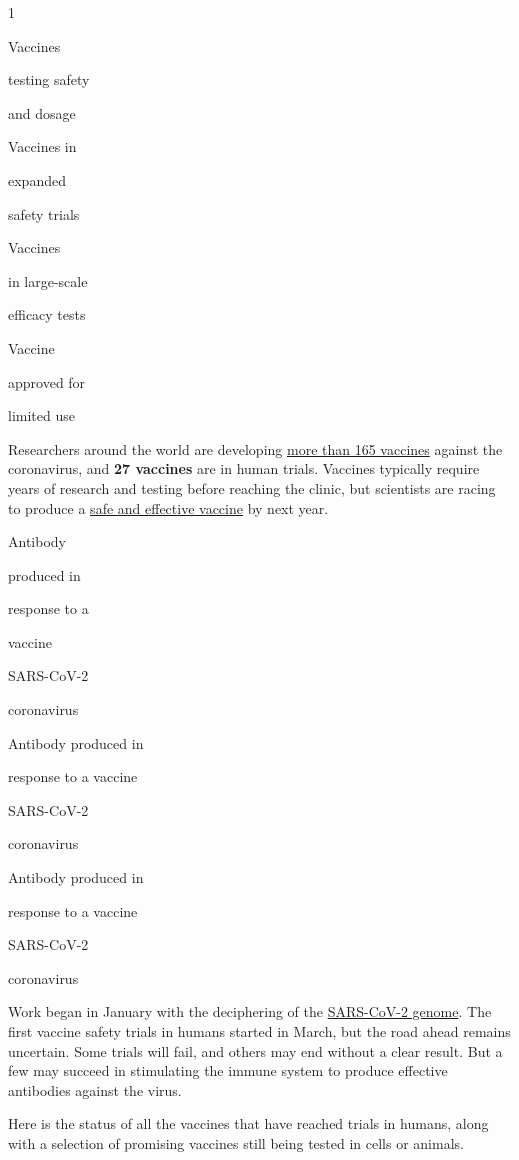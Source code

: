 1

Vaccines

testing safety

and dosage

Vaccines in

expanded

safety trials

Vaccines

in large-scale

efficacy tests

Vaccine

approved for

limited use

Researchers around the world are developing
\href{https://www.who.int/publications/m/item/draft-landscape-of-covid-19-candidate-vaccines}{more
than 165 vaccines} against the coronavirus, and \textbf{27 vaccines} are
in human trials. Vaccines typically require years of research and
testing before reaching the clinic, but scientists are racing to produce
a
\href{https://www.nytimes.com/interactive/2020/05/20/science/coronavirus-vaccine-development.html}{safe
and effective vaccine} by next year.

Antibody

produced in

response to a

vaccine

SARS-CoV-2

coronavirus

Antibody produced in

response to a vaccine

SARS-CoV-2

coronavirus

Antibody produced in

response to a vaccine

SARS-CoV-2

coronavirus

Work began in January with the deciphering of the
\href{https://www.nytimes.com/interactive/2020/04/03/science/coronavirus-genome-bad-news-wrapped-in-protein.html}{SARS-CoV-2
genome}. The first vaccine safety trials in humans started in March, but
the road ahead remains uncertain. Some trials will fail, and others may
end without a clear result. But a few may succeed in stimulating the
immune system to produce effective antibodies against the virus.

Here is the status of all the vaccines that have reached trials in
humans, along with a selection of promising vaccines still being tested
in cells or animals.


